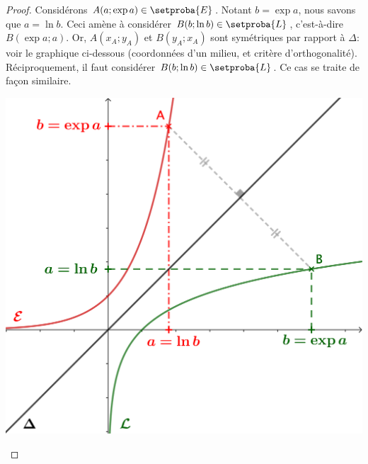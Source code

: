 \begin{proof}
    Considérons $A(a;\exp a) \in \setproba{E}$.
    Notant $b = \exp a$, nous savons que $a = \ln b$.
    Ceci amène à considérer $B(b;\ln b) \in \setproba{L}$,
    c'est-à-dire $B(\exp a;a)$.
    Or,
    $A(x_A;y_A)$ et $B(y_A;x_A)$ sont symétriques par rapport à $\Delta$:
    voir le graphique ci-dessous
    (coordonnées d'un milieu, et critère d'orthogonalité).
    Réciproquement, il faut considérer $B(b;\ln b) \in \setproba{L}$.
    Ce cas se traite de façon similaire.

    \begin{center}
        \includegraphics[scale=.85]{content/exp/graph.png}
    \end{center}

    \null
    \vspace{-6.5ex}
\end{proof}
